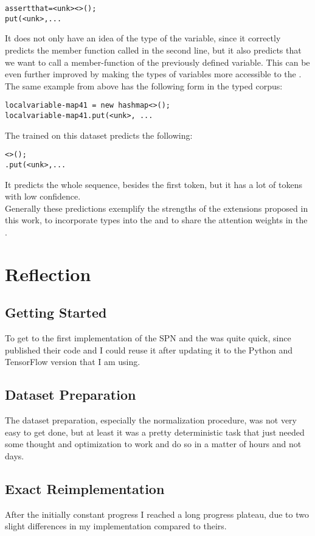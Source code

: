 \documentclass[11pt]{article}
\begin{document}
\begin{alltt}
assertthat =  <unk><>();
put(<unk>, ...
\end{alltt}
It does not only have an idea of the type of the variable, since it correctly predicts the member function called in the second line, but it also predicts that we want to call a member-function of the previously defined variable.
This can be even further improved by making the types of variables more accessible to the \spn. The same example from above has the following form in the typed corpus:
\begin{verbatim}
localvariable-map41 = new hashmap<>();
localvariable-map41.put(<unk>, ...
\end{verbatim}
The \spn trained on this dataset predicts the following:
\begin{alltt}
<>();
.put(<unk>, ...
\end{alltt}
It predicts the whole sequence, besides the first token, but it has a lot of tokens with low confidence.\\
Generally these predictions exemplify the strengths of the extensions proposed in this work, to incorporate types into the \spn and to share the attention weights in the \spn. 

\section{Reflection}
\subsection{Getting Started}
To get to the first implementation of the SPN and the \lmatt was quite quick, since \cite{bhoopchand2016learning} published their code and I could reuse it after updating it to the Python and TensorFlow version that I am using.
\subsection{Dataset Preparation}
The dataset preparation, especially the normalization procedure, was not very easy to get done, but at least it was a pretty deterministic task that just needed some thought and optimization to work and do so in a matter of hours and not days.
\subsection{Exact Reimplementation}
After the initially constant progress I reached a long progress plateau, due to two slight differences in my implementation compared to theirs.
\end{document}

